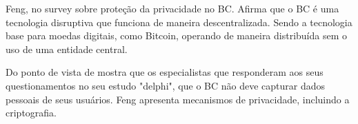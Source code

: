 Feng, no survey \cite{Feng2019} sobre proteção da privacidade no BC. Afirma que o BC é uma tecnologia disruptiva que funciona de maneira descentralizada. Sendo a tecnologia base para moedas digitais, como Bitcoin, operando de maneira distribuída sem o uso de uma entidade central.


Do ponto de vista de \cite{Schwerin2018} mostra que os especialistas que responderam aos seus questionamentos no seu estudo "delphi", que o BC não deve capturar dados pessoais de seus usuários. Feng apresenta mecanismos de privacidade, incluindo a criptografia. %



